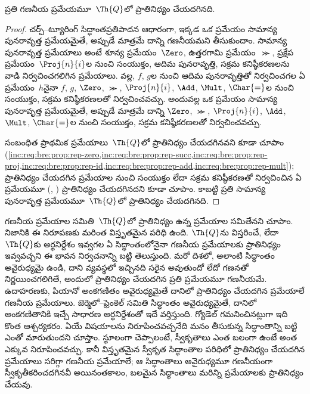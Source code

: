 \documentclass[../../../include/open-logic-section]{subfiles}
\begin{document}

\begin{thm}
ప్రతి గణనీయ ప్రమేయమూ~$\Th{Q}$లో ప్రాతినిధ్యం చేయదగినది.
\end{thm}

\begin{proof}
చర్చ్--ట్యూరింగ్ సిద్ధాంతప్రతిపాదన ఆధారంగా, ఇక్కడ ఒక ప్రమేయం సామాన్య
పునరావృత్త ప్రమేయమైతే, అప్పుడే మాత్రమే దాన్ని గణనీయమని తీసుకుందాం.
సామాన్య పునరావృత్త ప్రమేయాలు అంటే శూన్య ప్రమేయం~$\Zero$, ఉత్తరగామి
ప్రమేయం~$\Succ$, ప్రక్షేప ప్రమేయం~$\Proj{n}{i}$ల నుంచి సంయుక్తం, ఆదిమ
పునరావృత్తి, సక్రమ కనిష్ఠీకరణలను వాడి నిర్వచించగలిగిన ప్రమేయాలు.
 వల్ల, $f$, $g$ల నుంచి ఆదిమ పునరావృత్తితో నిర్వచించగల ఏ ప్రమేయం~$h$నైనా
$f$, $g$, $\Zero$, $\Succ$, $\Proj{n}{i}$, $\Add$, $\Mult$, $\Char{=}$ల
నుంచి సంయుక్తం, సక్రమ కనిష్ఠీకరణలతో నిర్వచించవచ్చు. అందువల్ల ఒక ప్రమేయం
సామాన్య పునరావృత్త ప్రమేయమైతే, అప్పుడే మాత్రమే దాన్ని $\Zero$, $\Succ$,
$\Proj{n}{i}$, $\Add$, $\Mult$, $\Char{=}$ల నుంచి సంయుక్తం, సక్రమ
కనిష్ఠీకరణలతో నిర్వచించవచ్చు.

సంబంధిత ప్రాథమిక ప్రమేయాలు~$\Th{Q}$లో ప్రాతినిధ్యం చేయదగినవని కూడా చూపాం
(\cref{inc:req:bre:prop:rep-zero,inc:req:bre:prop:rep-succ,inc:req:bre:prop:rep-proj,inc:req:bre:prop:rep-id,inc:req:bre:prop:rep-add,inc:req:bre:prop:rep-mult});
ప్రాతినిధ్యం చేయదగిన ప్రమేయాల నుంచి సంయుక్తం లేదా సక్రమ కనిష్ఠీకరణతో
నిర్వచించిన ఏ ప్రమేయమూ
(,
) ప్రాతినిధ్యం చేయదగినదని కూడా చూపాం.
కాబట్టి ప్రతి సామాన్య పునరావృత్త ప్రమేయమూ~$\Th{Q}$లో ప్రాతినిధ్యం
చేయదగినది.
\end{proof}

\begin{explain}
గణనీయ ప్రమేయాల సమితి~$\Th{Q}$లో ప్రాతినిధ్యం ఉన్న ప్రమేయాల సమితేనని
చూపాం. నిజానికి ఈ నిరూపణకు మరింత విస్తృతమైన పరిధి ఉంది.
$\Th{Q}$ను విస్తరించే, లేదా $\Th{Q}$కు అర్థనిర్దేశం ఇవ్వగల ఏ సిద్ధాంతంలోనైనా
గణనీయ ప్రమేయాలకు ప్రాతినిధ్యం ఇవ్వవచ్చని ఈ భావన నిర్వచనాన్ని బట్టి తెలుస్తుంది.
మరో దిశలో, అలాంటి సిద్ధాంతం అవైరుధ్యమై ఉండి, దాని
 వ్యవస్థలో ఇచ్చినది సరైన  అవుతుందో లేదో గణనతో
నిర్ణయించగలిగితే, అందులో ప్రాతినిధ్యం చేయదగిన ప్రతి ప్రమేయమూ గణనీయమే.
ఉదాహరణకు, పియానో అంకగణితం అవైరుధ్యమైతే దానిలో ప్రాతినిధ్యం చేయదగిన
ప్రమేయాలే గణనీయ ప్రమేయాలు. జెర్మెలో--ఫ్రెంకెల్ సమితి సిద్ధాంతం
అవైరుధ్యమైతే, దానిలో అంకగణితానికి ఇచ్చే సాధారణ అర్థనిర్దేశంతో ఇదే వర్తిస్తుంది. గ్యోడెల్ గమనించినట్లుగా ఇది కొంత ఆశ్చర్యకరం.
ఏయే విషయాలను నిరూపించవచ్చనేది మనం తీసుకున్న సిద్ధాంతాన్ని బట్టి ఎంతో
మారుతుందని చూస్తాం. స్థూలంగా చెప్పాలంటే, స్వీకృతాలు ఎంత బలంగా ఉంటే
అంత ఎక్కువ నిరూపించవచ్చు. కానీ విస్తృతమైన స్వీకృత సిద్ధాంతాల
పరిధిలో ప్రాతినిధ్యం చేయదగిన ప్రమేయాలు సరిగ్గా గణనీయ ప్రమేయాలే; ఆ సిద్ధాంతాలు
అవైరుధ్యమూ గణనీయంగా స్వీకృతీకరించదగినవీ అయినంతకాలం, బలమైన సిద్ధాంతాలు మరిన్ని ప్రమేయాలకు
ప్రాతినిధ్యం చేయవు.
\end{explain}
\end{document}
